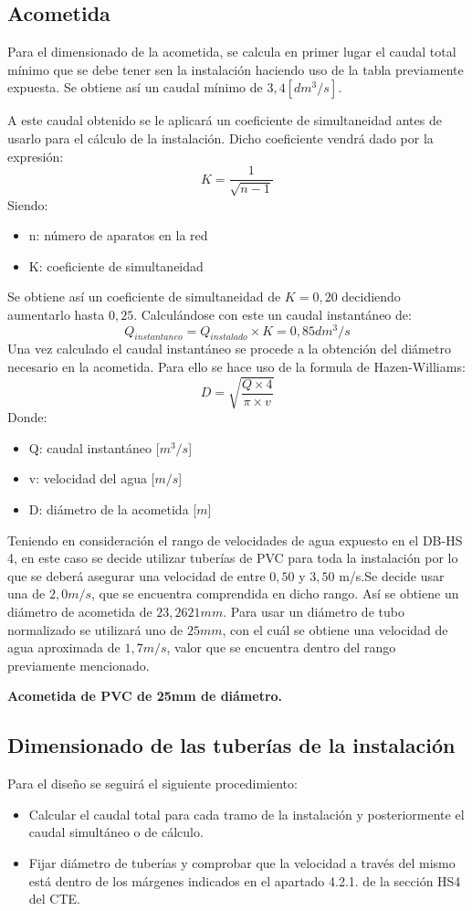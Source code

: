 \documentclass[../main.tex]{subfiles}
\begin{document}
\subsection{Acometida}
Para el dimensionado de la acometida, se calcula en primer lugar el caudal total mínimo que se debe tener sen la instalación haciendo uso de la tabla previamente expuesta. Se obtiene así un caudal mínimo de $3,4 [dm^3/s]$.\par
\vspace{0.5 cm}
A este caudal obtenido se le aplicará un coeficiente de simultaneidad antes de usarlo para el cálculo de la instalación. Dicho coeficiente vendrá dado por la expresión:
\[K = \frac{1}{\sqrt{n - 1}}\]
Siendo:
\begin{itemize}
    \item n: número de aparatos en la red
    \item K: coeficiente de simultaneidad
\end{itemize}
Se obtiene así un coeficiente de simultaneidad de $K = 0,20$ decidiendo aumentarlo hasta $0,25$. Calculándose con este un caudal instantáneo de:
\[Q_{instantaneo} = Q_{instalado} \times K = 0,85 dm^3/s\]
Una vez calculado el caudal instantáneo se procede a la obtención del diámetro necesario en la acometida. Para ello se hace uso de la formula de Hazen-Williams:
\[D = \sqrt{\frac{Q \times 4}{\pi \times v}}\]
Donde:
\begin{itemize}
    \item Q: caudal instantáneo [$m^3/s$]
    \item v: velocidad del agua [$m/s$]
    \item D: diámetro de la acometida [$m$]
\end{itemize}
Teniendo en consideración el rango de velocidades de agua expuesto en el DB-HS 4, en este caso se decide utilizar tuberías de PVC para toda la instalación por lo que se deberá asegurar una velocidad de entre $0,50$ y $3,50$ m/s.Se decide usar una de $2,0 m/s$, que se encuentra comprendida en dicho rango. Así se obtiene un diámetro de acometida de $23,2621 mm$. Para usar un diámetro de tubo normalizado se utilizará uno de $25 mm$, con el cuál se obtiene una velocidad de agua aproximada de $1,7 m/s$, valor que se encuentra dentro del rango previamente mencionado. \par
\vspace{0.5 cm}
\textbf{Acometida de PVC de 25mm de diámetro.}

\subsection{Dimensionado de las tuberías de la instalación}
Para el diseño se seguirá el siguiente procedimiento:
\begin{itemize}
    \item Calcular el caudal total para cada tramo de la instalación y posteriormente el caudal simultáneo o de cálculo.
    \item Fijar diámetro de tuberías y comprobar que la velocidad a través del mismo está dentro de los márgenes indicados en el apartado 4.2.1. de la sección HS4 del CTE.
\end{itemize}
\end{document}
